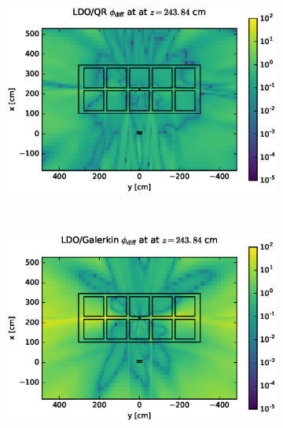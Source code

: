 \documentclass{article} %
\begin{document}
\clearpage
\begin{figure}[!htb]
\begin{subfigure}{\textwidth}
\centering
\includegraphics[max height=0.445\textheight]
{portal-flux-diff-qr.eps}
\end{subfigure}
\\
\begin{subfigure}{\textwidth}
\centering
\includegraphics[max height=0.445\textheight]
{portal-flux-diff-gkn.eps}
\end{subfigure}
\end{figure}
\clearpage
\end{document}

